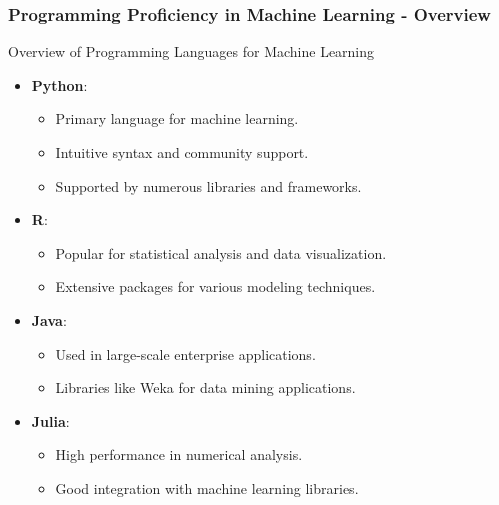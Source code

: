 \documentclass{beamer}
\begin{document}
\begin{frame}[fragile]
    \frametitle{Programming Proficiency in Machine Learning - Overview}
    \begin{block}{Overview of Programming Languages for Machine Learning}
        \begin{itemize}
            \item \textbf{Python}: 
            \begin{itemize}
                \item Primary language for machine learning.
                \item Intuitive syntax and community support.
                \item Supported by numerous libraries and frameworks.
            \end{itemize}
            \item \textbf{R}: 
            \begin{itemize}
                \item Popular for statistical analysis and data visualization.
                \item Extensive packages for various modeling techniques.
            \end{itemize}
            \item \textbf{Java}: 
            \begin{itemize}
                \item Used in large-scale enterprise applications.
                \item Libraries like Weka for data mining applications.
            \end{itemize}
            \item \textbf{Julia}: 
            \begin{itemize}
                \item High performance in numerical analysis.
                \item Good integration with machine learning libraries.
            \end{itemize}
        \end{itemize}
    \end{block}
\end{frame}
\end{document}
